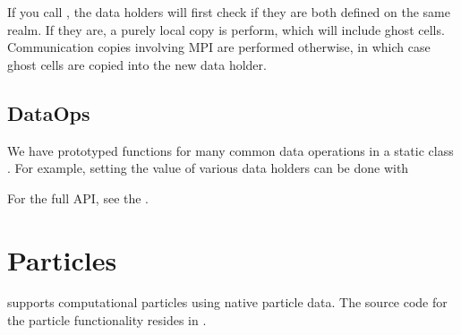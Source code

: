 \documentclass[letterpaper,10pt,english]{sphinxmanual}
\begin{document}
If you call , the data holders will first check if they are both defined on the same realm.
If they are, a purely local copy is perform, which will include ghost cells.
Communication copies involving MPI are performed otherwise, in which case ghost cells are  copied into the new data holder.


\subsection{DataOps}
\label{\detokenize{Source/MeshData:dataops}}\label{\detokenize{Source/MeshData:chap-dataops}}
We have prototyped functions for many common data operations in a static class .
For example, setting the value of various data holders can be done with

\begin{sphinxVerbatim}[commandchars=\\\{\},formatcom=\scriptsize]
 
 
   

 
 
 
\end{sphinxVerbatim}

For the full API, see the .


\section{Particles}
\label{\detokenize{Source/Particles:particles}}\label{\detokenize{Source/Particles:chap-particles}}\label{\detokenize{Source/Particles::doc}}
 supports computational particles using native  particle data.
The source code for the particle functionality resides in .
\end{document}
